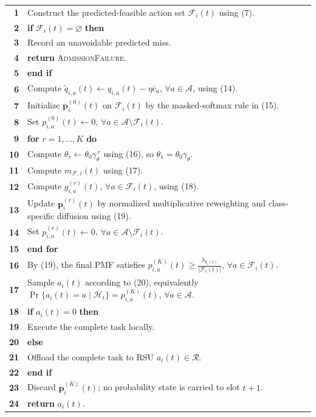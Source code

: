 \documentclass[10pt]{article}
\newcommand{\lnum}[1]{\textbf{#1}}
\begin{document}
\vspace{4pt}
\small
\begin{tabularx}{\textwidth}{N Y}
\lnum{1} & Construct the predicted-feasible action set $\mathcal F_i(t)$ using (7). \\
\lnum{2} & \textbf{if} $\mathcal F_i(t)=\varnothing$ \textbf{then} \\
\lnum{3} & \quad Record an unavoidable predicted miss. \\
\lnum{4} & \quad \textbf{return} \textsc{AdmissionFailure}. \\
\lnum{5} & \textbf{end if} \\
\lnum{6} & Compute $\widetilde q_{i,a}(t)\gets q_{i,a}(t)-\eta\bar c_a$, $\forall a\in\mathcal A$, using (14). \\
\lnum{7} & Initialize $\mathbf p_i^{(0)}(t)$ on $\mathcal F_i(t)$ by the masked-softmax rule in (15). \\
\lnum{8} & Set $p_{i,a}^{(0)}(t)\gets0$, $\forall a\in\mathcal A\setminus\mathcal F_i(t)$. \\
\lnum{9} & \textbf{for} $r=1,\ldots,K$ \textbf{do} \\
\lnum{10} & \quad Compute $\theta_r\gets\theta_0\gamma_\theta^{\,r}$ using (16), so $\theta_1=\theta_0\gamma_\theta$. \\
\lnum{11} & \quad Compute $m_{\mathcal F,i}(t)$ using (17). \\
\lnum{12} & \quad Compute $g_{i,a}^{(r)}(t)$, $\forall a\in\mathcal F_i(t)$, using (18). \\
\lnum{13} & \quad Update $\mathbf p_i^{(r)}(t)$ by normalized multiplicative reweighting and class-specific diffusion using (19). \\
\lnum{14} & \quad Set $p_{i,a}^{(r)}(t)\gets0$, $\forall a\in\mathcal A\setminus\mathcal F_i(t)$. \\
\lnum{15} & \textbf{end for} \\
\lnum{16} & By (19), the final PMF satisfies
$\displaystyle p_{i,a}^{(K)}(t)\geq\frac{\lambda_{k_i(t)}}{|\mathcal F_i(t)|}$,
$\forall a\in\mathcal F_i(t)$. \\
\lnum{17} & Sample $a_i(t)$ according to (20), equivalently
$\Pr\{a_i(t)=a\mid\mathcal H_t\}=p_{i,a}^{(K)}(t)$,
$\forall a\in\mathcal A$. \\
\lnum{18} & \textbf{if} $a_i(t)=0$ \textbf{then} \\
\lnum{19} & \quad Execute the complete task locally. \\
\lnum{20} & \textbf{else} \\
\lnum{21} & \quad Offload the complete task to RSU $a_i(t)\in\mathcal R$. \\
\lnum{22} & \textbf{end if} \\
\lnum{23} & Discard $\mathbf p_i^{(K)}(t)$; no probability state is carried to slot $t+1$. \\
\lnum{24} & \textbf{return} $a_i(t)$. \\
\end{tabularx}
\end{document}
